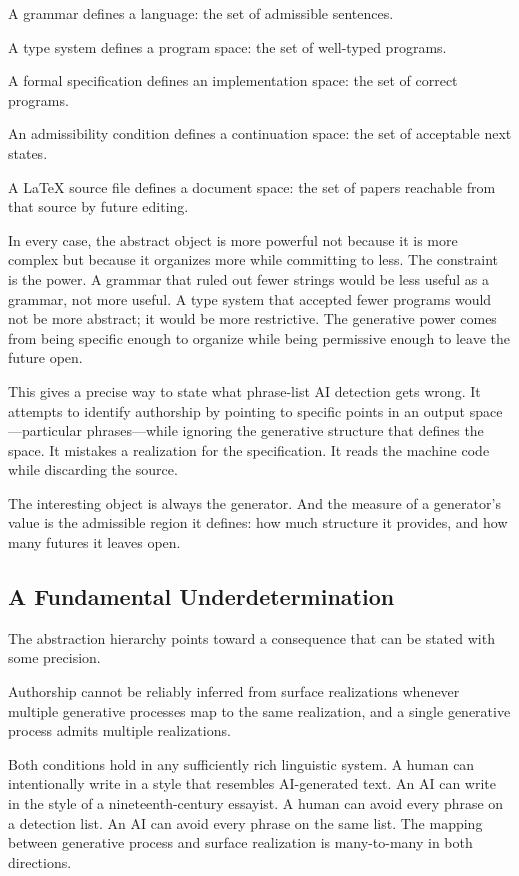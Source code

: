 \documentclass[12pt]{article}
\begin{document}
A grammar defines a language: the set of admissible sentences.

A type system defines a program space: the set of well-typed programs.

A formal specification defines an implementation space: the set of correct programs.

An admissibility condition defines a continuation space: the set of acceptable next states.

A \LaTeX{} source file defines a document space: the set of papers reachable from that source by future editing.

In every case, the abstract object is more powerful not because it is more complex but because it organizes more while committing to less. The constraint is the power. A grammar that ruled out fewer strings would be less useful as a grammar, not more useful. A type system that accepted fewer programs would not be more abstract; it would be more restrictive. The generative power comes from being specific enough to organize while being permissive enough to leave the future open.

This gives a precise way to state what phrase-list AI detection gets wrong. It attempts to identify authorship by pointing to specific points in an output space---particular phrases---while ignoring the generative structure that defines the space. It mistakes a realization for the specification. It reads the machine code while discarding the source.

The interesting object is always the generator. And the measure of a generator's value is the admissible region it defines: how much structure it provides, and how many futures it leaves open.

\subsection*{A Fundamental Underdetermination}

The abstraction hierarchy points toward a consequence that can be stated with some precision.

Authorship cannot be reliably inferred from surface realizations whenever multiple generative processes map to the same realization, and a single generative process admits multiple realizations.

Both conditions hold in any sufficiently rich linguistic system. A human can intentionally write in a style that resembles AI-generated text. An AI can write in the style of a nineteenth-century essayist. A human can avoid every phrase on a detection list. An AI can avoid every phrase on the same list. The mapping between generative process and surface realization is many-to-many in both directions.
\end{document}
